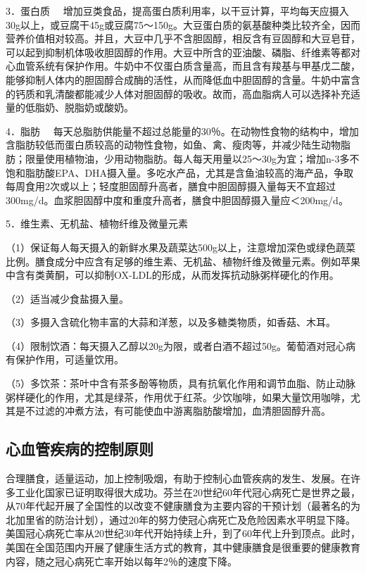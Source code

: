 {3．蛋白质}
　增加豆类食品，提高蛋白质利用率，以干豆计算，平均每天应摄入30g以上，或豆腐干45g或豆腐75～150g。大豆蛋白质的氨基酸种类比较齐全，因而营养价值相对较高。并且，大豆中几乎不含胆固醇，相反含有豆固醇和大豆皂苷，可以起到抑制机体吸收胆固醇的作用。大豆中所含的亚油酸、磷脂、纤维素等都对心血管系统有保护作用。牛奶中不仅蛋白质含量高，而且含有羧基与甲基戊二酸，能够抑制人体内的胆固醇合成酶的活性，从而降低血中胆固醇的含量。牛奶中富含的钙质和乳清酸都能减少人体对胆固醇的吸收。故而，高血脂病人可以选择补充适量的低脂奶、脱脂奶或酸奶。

{4．脂肪}
　每天总脂肪供能量不超过总能量的30％。在动物性食物的结构中，增加含脂肪较低而蛋白质较高的动物性食物，如鱼、禽、瘦肉等，并减少陆生动物脂肪；限量使用植物油，少用动物脂肪。每人每天用量以25～30g为宜；增加n-3多不饱和脂肪酸EPA、DHA摄入量。多吃水产品，尤其是含鱼油较高的海产品，争取每周食用2次或以上；轻度胆固醇升高者，膳食中胆固醇摄入量每天不宜超过300mg/d。血浆胆固醇中度和重度升高者，膳食中胆固醇摄入量应＜200mg/d。

{5．维生素、无机盐、植物纤维及微量元素}

（1）保证每人每天摄入的新鲜水果及蔬菜达500g以上，注意增加深色或绿色蔬菜比例。膳食成分中应含有足够的维生素、无机盐、植物纤维及微量元素。例如苹果中含有类黄酮，可以抑制OX-LDL的形成，从而发挥抗动脉粥样硬化的作用。

（2）适当减少食盐摄入量。

（3）多摄入含硫化物丰富的大蒜和洋葱，以及多糖类物质，如香菇、木耳。

（4）限制饮酒：每天摄入乙醇以20g为限，或者白酒不超过50g。葡萄酒对冠心病有保护作用，可适量饮用。

（5）多饮茶：茶叶中含有茶多酚等物质，具有抗氧化作用和调节血脂、防止动脉粥样硬化的作用，尤其是绿茶，作用优于红茶。少饮咖啡，如果大量饮用咖啡，尤其是不过滤的冲煮方法，有可能使血中游离脂肪酸增加，血清胆固醇升高。

\hypertarget{text00004.htmlux5cux23mllj10}{%
\subsection{心血管疾病的控制原则}\label{text00004.htmlux5cux23mllj10}}

合理膳食，适量运动，加上控制吸烟，有助于控制心血管疾病的发生、发展。在许多工业化国家已证明取得很大成功。芬兰在20世纪60年代冠心病死亡是世界之最，从70年代起开展了全国性的以改变不健康膳食为主要内容的干预计划（最著名的为北加里省的防治计划），通过20年的努力使冠心病死亡及危险因素水平明显下降。美国冠心病死亡率从20世纪30年代开始持续上升，到了60年代上升到顶点。此时，美国在全国范围内开展了健康生活方式的教育，其中健康膳食是很重要的健康教育内容，随之冠心病死亡率开始以每年2％的速度下降。

